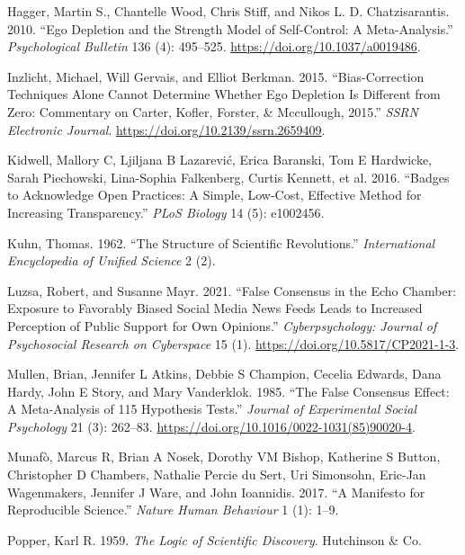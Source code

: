 \documentclass[
  letterpaper,
]{book}
\newlength{\cslhangindent}
\newenvironment{CSLReferences}[2] %
 {\begin{list}{}{%
  \setlength{\itemindent}{0pt}
  \setlength{\leftmargin}{0pt}
  \setlength{\parsep}{0pt}
  \ifodd #1
   \setlength{\leftmargin}{\cslhangindent}
   \setlength{\itemindent}{-1\cslhangindent}
  \fi
  \setlength{\itemsep}{#2\baselineskip}}}
 {\end{list}}
\begin{document}
\begin{CSLReferences}{1}{0}
Hagger, Martin S., Chantelle Wood, Chris Stiff, and Nikos L. D.
Chatzisarantis. 2010. {``Ego Depletion and the Strength Model of
Self-Control: A Meta-Analysis.''} \emph{Psychological Bulletin} 136 (4):
495--525. \url{https://doi.org/10.1037/a0019486}.

Inzlicht, Michael, Will Gervais, and Elliot Berkman. 2015.
{``Bias-Correction Techniques Alone Cannot Determine Whether Ego
Depletion Is Different from Zero: Commentary on Carter, Kofler, Forster,
\& Mccullough, 2015.''} \emph{SSRN Electronic Journal}.
\url{https://doi.org/10.2139/ssrn.2659409}.

Kidwell, Mallory C, Ljiljana B Lazarević, Erica Baranski, Tom E
Hardwicke, Sarah Piechowski, Lina-Sophia Falkenberg, Curtis Kennett, et
al. 2016. {``Badges to Acknowledge Open Practices: A Simple, Low-Cost,
Effective Method for Increasing Transparency.''} \emph{PLoS Biology} 14
(5): e1002456.

Kuhn, Thomas. 1962. {``The Structure of Scientific Revolutions.''}
\emph{International Encyclopedia of Unified Science} 2 (2).

Luzsa, Robert, and Susanne Mayr. 2021. {``False Consensus in the Echo
Chamber: {Exposure} to Favorably Biased Social Media News Feeds Leads to
Increased Perception of Public Support for Own Opinions.''}
\emph{Cyberpsychology: Journal of Psychosocial Research on Cyberspace}
15 (1). \url{https://doi.org/10.5817/CP2021-1-3}.

Mullen, Brian, Jennifer L Atkins, Debbie S Champion, Cecelia Edwards,
Dana Hardy, John E Story, and Mary Vanderklok. 1985. {``The False
Consensus Effect: {A} Meta-Analysis of 115 Hypothesis Tests.''}
\emph{Journal of Experimental Social Psychology} 21 (3): 262--83.
\url{https://doi.org/10.1016/0022-1031(85)90020-4}.

Munafò, Marcus R, Brian A Nosek, Dorothy VM Bishop, Katherine S Button,
Christopher D Chambers, Nathalie Percie du Sert, Uri Simonsohn, Eric-Jan
Wagenmakers, Jennifer J Ware, and John Ioannidis. 2017. {``A Manifesto
for Reproducible Science.''} \emph{Nature Human Behaviour} 1 (1): 1--9.

Popper, Karl R. 1959. \emph{The Logic of Scientific Discovery}.
Hutchinson \& Co.


\end{CSLReferences}
\end{document}
